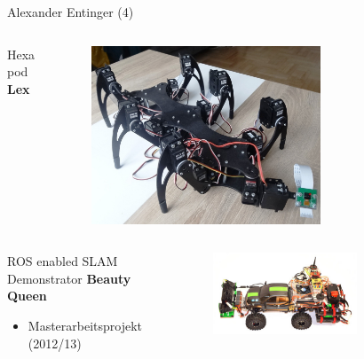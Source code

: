 \documentclass{beamer}
\begin{document}
\begin{frame}{Alexander Entinger (4)}
\begin{columns}
 \begin{column}{0.5\textwidth}
  \begin{large}Hexapod \textbf{Lex}\end{large}
 \end{column}
 \begin{column}{0.5\textwidth}
  \begin{figure}[H]
   \centering
   \includegraphics[width=0.7\textwidth]{./images/robot-lex.jpg}
   \label{fig:robot-lex}
  \end{figure}
 \end{column}
\end{columns}

\begin{columns}
 \begin{column}{0.5\textwidth}
  \begin{large}ROS enabled SLAM Demonstrator \textbf{Beauty Queen}\end{large}
  \begin{itemize}
   \item Masterarbeitsprojekt (2012/13)
  \end{itemize}
 \end{column}
 \begin{column}{0.5\textwidth}
  \begin{figure}[H]
   \centering
   \includegraphics[width=0.7\textwidth]{./images/robot-beauty-queen.jpg}
   \label{fig:robot-beauty-queen}
  \end{figure}
 \end{column}
\end{columns}
\end{frame}
\end{document}
